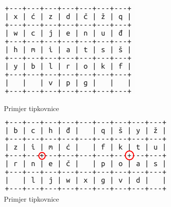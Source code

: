 \documentclass[times, utf8, zavrsni, numeric]{fer}
\begin{document}
\begin{figure}[htb]
  \centering
  \begin{minipage}[b]{0.48\textwidth}
    \includegraphics[width=\textwidth]{img/primjer.png}
    \caption{Primjer tipkovnice}
    \label{fig:fitts_primjer}
  \end{minipage}
  \hfill
  \begin{minipage}[b]{0.48\textwidth}
    \includegraphics[width=\textwidth]{img/2hand_primjer.png}
    \caption{Primjer tipkovnice}
    \label{fig:fitts_primjer2}
  \end{minipage}
\end{figure}
\end{document}
